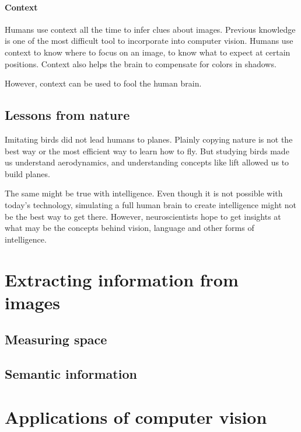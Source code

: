 \documentclass{article}
\begin{document}
\paragraph{Context}
Humans use context all the time to infer clues about images. Previous knowledge is one of the most difficult tool to incorporate into computer vision. Humans use context to know where to focus on an image, to know what to expect at certain positions. Context also helps the brain to compensate for colors in shadows.

However, context can be used to fool the human brain.

\subsection{Lessons from nature}
Imitating birds did not lead humans to planes. Plainly copying nature is not the best way or the most efficient way to learn how to fly. But studying birds made us understand aerodynamics, and understanding concepts like lift allowed us to build planes.

The same might be true with intelligence. Even though it is not possible with today's technology, simulating a full human brain to create intelligence might not be the best way to get there. However, neuroscientists hope to get insights at what may be the concepts behind vision, language and other forms of intelligence.

\section{Extracting information from images}

\subsection{Measuring space}
\subsection{Semantic information}


\section{Applications of computer vision} \label{applications}



\small


\end{document}
